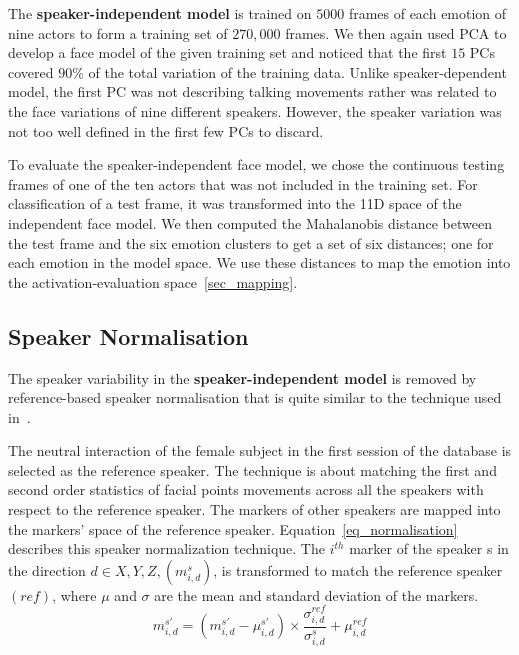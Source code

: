 \documentclass[10pt,journal,cspaper,compsoc]{IEEEtran}
\begin{document}
The \textbf{speaker-independent model}  is trained on $5000$ frames of each emotion of nine actors to form a training set of $270,000$ frames. We then again used PCA to develop a face model of the given training set and noticed that the first $15$ PCs covered $90\%$ of the total variation of the training data. Unlike speaker-dependent model, the first PC was not describing talking movements rather was related to the face variations of nine different speakers. However, the speaker variation was not too well defined in the first few PCs to discard. 

To evaluate the speaker-independent face model, we chose the continuous testing frames of one of the ten actors that was not included in the training set. For classification of a test frame, it was transformed into the 11D space of the independent face model. We then computed the Mahalanobis distance between the test frame and the six emotion clusters to get a set of six distances; one for each emotion in the model space. We use these distances to map the emotion into the activation-evaluation space~\ref{sec_mapping}.

\subsection{Speaker Normalisation}
The speaker variability in the \textbf{speaker-independent model} is removed by reference-based speaker normalisation that is quite similar to the technique used in~\cite{ACTORIZING SPEAKER, LEXICAL AND EMOTIONAL VARIABILITIES OBSERVED IN FACIAL EXPRESSIONS}. 

The neutral interaction of the female subject in the first session of the database is selected as the reference speaker. The technique is about matching the first and second order statistics of facial points movements across all the speakers with respect to the reference speaker. The markers of other speakers are mapped into the markers' space of the reference speaker. Equation~\ref{eq_normalisation} describes this speaker normalization technique. The $i^{th}$ marker of the speaker s in the direction $d \in {X,Y,Z}, (m_{i,d}^{s})$, is transformed to match the reference speaker $(ref)$, where $\mu$ and $\sigma$ are the mean and standard deviation of the markers.
\begin{equation}
m_{i,d}^{s'}=(m_{i,d}^{s'}-\mu_{i,d}^{s'}) \times \frac{\sigma_{i,d}^{ref}}{\sigma_{i,d}^{s}} + \mu_{i,d}^{ref}
\label{eq_normalisation}
\end{equation}
\end{document}
